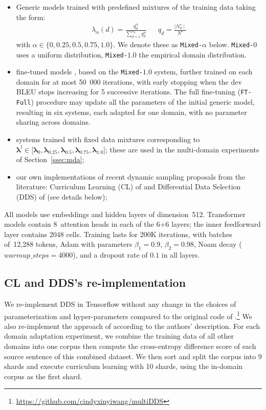 \documentclass[11pt]{article}
\newcommand{\fyDone}[1]{\done[FY]\Todo[FY:]{\textcolor{orange}{#1}}}
\newcommand{\system}[1]{\texttt{{#1}}}
\newcommand{\vlambda}{\ensuremath{\boldsymbol\lambda}\xspace} %
\begin{document}
\begin{itemize}
\itemsep0em 
\item Generic models trained with predefined mixtures of the training data taking the form:
\begin{align} \label{mixture:trn}
\lambda_{\alpha}(d) = \frac{q_d^{\alpha}}{\displaystyle{\mathop{\sum}_{d=1}^{n_d}q_d^{\alpha}}} &&
q_d = \frac{\mid N^{s}_d \mid}{\displaystyle{N^{s}}} %
\end{align}
with $\alpha \in \{0,0.25,0.5,0.75,1.0\}$. We denote these as \system{Mixed-$\alpha$} below. \system{Mixed-$0$} uses a uniform distribution, \system{Mixed-$1.0$} the empirical domain distribution.
\item fine-tuned models \citep{Luong15stanford,Freitag16fast}, based on the \system{Mixed-$1.0$} system, further trained on each domain for at most 50~000 iterations, with early stopping when the dev BLEU stops increasing for 5 successive iterations.\fyDone{for ?? iterations} The full fine-tuning (\system{FT-Full}) procedure may update all the parameters of the initial generic model, resulting in six systems, each adapted for one domain, with no parameter sharing across domains.
\item systems trained with fixed data mixtures corresponding to $\vlambda^l \in \big[ \vlambda_0, \vlambda_{0.25}, \vlambda_{0.5}, \vlambda_{0.75}, \vlambda_{1.0}\big]$; these are used in the multi-domain experiments of Section~\ref{ssec:mda};
\item  our own implementations of recent dynamic sampling proposals from the literature: Curriculum Learning (CL) of \citet{Zhang19curriculum} and Differential Data Selection (DDS) of \citet{Wang20balancing} (see details below);
\end{itemize}

All models use embeddings and hidden layers of dimension~512. Transformer models contain 8~attention heads in each of the 6+6 layers; the inner feedforward layer contains 2048 cells. Training lasts for 200K iterations, with batches of~12,288 tokens, Adam with parameters $\beta_1=0.9$, $\beta_2= 0.98$, Noam decay ($warmup\_steps=4000$), and a dropout rate of $0.1$ in all layers.

\subsection{CL and DDS's re-implementation}\fyDone{Right place for this ?}
We re-implement DDS in Tensorflow without any change in the choices of parameterization and hyper-parameters compared to the original code of \citet{Wang20balancing}.\footnote{\url{https://github.com/cindyxinyiwang/multiDDS}}
% 
We also re-implement the approach of \citet{Zhang19curriculum} according to the authors' description. For each domain adaptation experiment, we combine the training data of all other domains into one corpus then compute the cross-entropy difference score of each source sentence of this combined dataset. We then sort and split the corpus into 9 shards and execute curriculum learning with 10 shards, using the in-domain corpus as the first shard.
\end{document}
